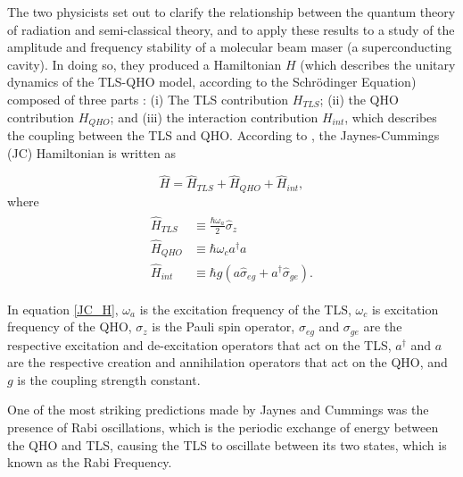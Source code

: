 \documentclass[12pt,a4paper]{article}
\begin{document}
The two physicists set out to clarify the relationship between the quantum theory of radiation and semi-classical theory, and to apply these results to a study of the amplitude and frequency stability of a molecular beam maser (a superconducting cavity). In doing so, they produced a Hamiltonian $H$ (which describes the unitary dynamics of the TLS-QHO model, according to the Schrödinger Equation) composed of three parts \cite{Hamiltonian2012-JC_Friction}: (i) The TLS contribution $H_{TLS}$; (ii) the QHO  contribution $H_{QHO}$; and (iii) the interaction contribution $H_{int}$, which describes the coupling between the TLS and QHO. According to \cite{General2024-JCM_relevance}, the Jaynes-Cummings (JC) Hamiltonian is written as

\begin{equation}
    \hat{H} = \hat{H}_{TLS} + \hat{H}_{QHO} + \hat{H}_{int}, 
\end{equation} \label{JC_H}
where 
\begin{align*}
    \begin{aligned}
        \hat{H}_{TLS} &\equiv \frac{\hbar\omega_a}{2}\hat{\sigma}_z \\
        \hat{H}_{QHO} &\equiv \hbar\omega_ca^\dagger a \\
        \hat{H}_{int} &\equiv \hbar g(a\hat{\sigma}_{eg} + a^\dagger\hat{\sigma}_{ge}).
    \end{aligned}
\end{align*}

In equation \eqref{JC_H}, $\omega_a$ is the excitation frequency of the TLS, $\omega_c$ is excitation frequency of the QHO, $\sigma_z$ is the Pauli spin operator, $\sigma_{eg}$ and $\sigma_{ge}$ are the respective excitation and de-excitation operators that act on the TLS, $a^\dagger$ and $a$ are the respective creation and annihilation operators that act on the QHO, and $g$ is the coupling strength constant. 

One of the most striking predictions made by Jaynes and Cummings was the presence of Rabi oscillations, which is the periodic exchange of energy between the QHO and TLS, causing the TLS to oscillate between its two states, which is known as the Rabi Frequency. 
\end{document}
